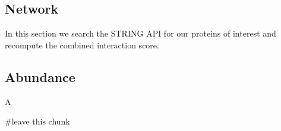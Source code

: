 \documentclass[
]{article}
\newenvironment{Shaded}{\begin{snugshade}}{\end{snugshade}}
\newcommand{\CommentTok}[1]{\textcolor[rgb]{0.50,0.62,0.50}{#1}}
\let\oldShaded\Shaded
\let\endoldShaded\endShaded
\renewenvironment{Shaded}{\scriptsize\oldShaded}{\endoldShaded}
\begin{document}
\hypertarget{network-1}{%
\subsection{Network}\label{network-1}}

In this section we search the STRING API for our proteins of interest
and recompute the combined interaction score.


\hypertarget{abundance}{%
\subsection{Abundance}\label{abundance}}

A 

\begin{Shaded}
\begin{Highlighting}[]
\CommentTok{#leave this chunk}
\end{Highlighting}
\end{Shaded}
\end{document}
